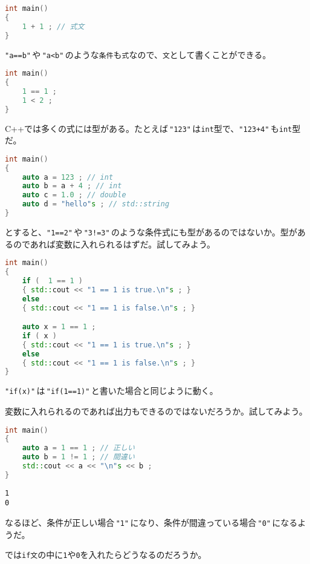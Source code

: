 \begin{lstlisting}[language={C++}]
int main()
{
    1 + 1 ; // 式文
}
\end{lstlisting}

\texttt{"a==b"}\,や\,\texttt{"a<b"}\,のような\texttt{条件}も\texttt{式}なので、\texttt{文}として書くことができる。

\ifTombow\enlargethispage{3mm}\fi
\begin{lstlisting}[language={C++}]
int main()
{
    1 == 1 ;
    1 < 2 ;
}
\end{lstlisting}

C++では多くの式には型がある。たとえば\,\texttt{"123"}\,は\texttt{int}型で、\texttt{"123+4"}\,も\texttt{int}型だ。

\begin{lstlisting}[language={C++}]
int main()
{
    auto a = 123 ; // int
    auto b = a + 4 ; // int
    auto c = 1.0 ; // double
    auto d = "hello"s ; // std::string
}
\end{lstlisting}

とすると、\texttt{"1==2"}\,や\,\texttt{"3!=3"}\,のような条件式にも型があるのではないか。型があるのであれば変数に入れられるはずだ。試してみよう。

\begin{lstlisting}[language={C++}]
int main()
{
    if (  1 == 1 )
    { std::cout << "1 == 1 is true.\n"s ; }
    else
    { std::cout << "1 == 1 is false.\n"s ; }

    auto x = 1 == 1 ;
    if ( x )
    { std::cout << "1 == 1 is true.\n"s ; }
    else
    { std::cout << "1 == 1 is false.\n"s ; }
}
\end{lstlisting}

\texttt{"if(x)"}\,は\,\texttt{"if(1==1)"}\,と書いた場合と同じように動く。

変数に入れられるのであれば出力もできるのではないだろうか。試してみよう。

\begin{lstlisting}[language={C++}]
int main()
{
    auto a = 1 == 1 ; // 正しい
    auto b = 1 != 1 ; // 間違い
    std::cout << a << "\n"s << b ;
}
\end{lstlisting}

\begin{lstlisting}[style=terminal]
1
0
\end{lstlisting}

なるほど、条件が正しい場合\,\texttt{"1"}\,になり、条件が間違っている場合\,\texttt{"0"}\,になるようだ。

では\texttt{if文}の中に\texttt{1}や\texttt{0}を入れたらどうなるのだろうか。

